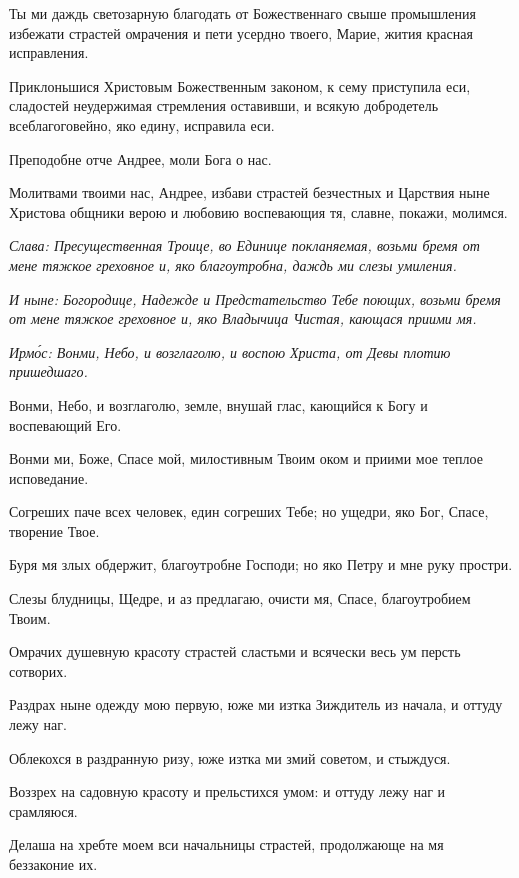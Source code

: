 Ты ми даждь светозарную благодать от Божественнаго свыше промышления избежати страстей омрачения и пети усердно твоего, Марие, жития красная исправления.


Приклоньшися Христовым Божественным законом, к сему приступила еси, сладостей неудержимая стремления оставивши, и всякую добродетель всеблагоговейно, яко едину, исправила еси.

Преподобне отче Андрее, моли Бога о нас.

Молитвами твоими нас, Андрее, избави страстей безчестных и Царствия ныне Христова общники верою и любовию воспевающия тя, славне, покажи, молимся.

\itshape Слава\normalfont{}: Пресущественная Троице, во Единице покланяемая, возьми бремя от мене тяжкое греховное и, яко благоутробна, даждь ми слезы умиления.

\itshape И ныне\normalfont{}: Богородице, Надежде и Предстательство Тебе поющих, возьми бремя от мене тяжкое греховное и, яко Владычица Чистая, кающася приими мя. 


\itshape Ирм\'{о}с\normalfont{}: Вонми, Небо, и возглаголю, и воспою Христа, от Девы плотию пришедшаго.

Вонми, Небо, и возглаголю, земле, внушай глас, кающийся к Богу и воспевающий Его.

Вонми ми, Боже, Спасе мой, милостивным Твоим оком и приими мое теплое исповедание.

Согреших паче всех человек, един согреших Тебе; но ущедри, яко Бог, Спасе, творение Твое.

Буря мя злых обдержит, благоутробне Господи; но яко Петру и мне руку простри.

Слезы блудницы, Щедре, и аз предлагаю, очисти мя, Спасе, благоутробием Твоим.

Омрачих душевную красоту страстей сластьми и всячески весь ум персть сотворих.

Раздрах ныне одежду мою первую, юже ми изтка Зиждитель из начала, и оттуду лежу наг.

Облекохся в раздранную ризу, юже изтка ми змий советом, и стыждуся.

Воззрех на садовную красоту и прельстихся умом: и оттуду лежу наг и срамляюся.

Делаша на хребте моем вси начальницы страстей, продолжающе на мя беззаконие их.

